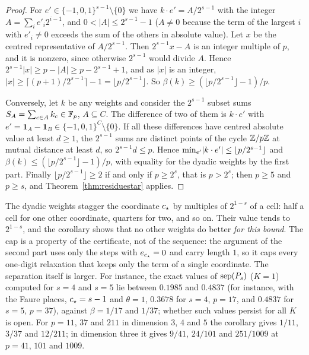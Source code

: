 \begin{proof}
For $e'\in\{-1,0,1\}^{s-1}\setminus\{0\}$ we have $k\cdot e'=A/2^{s-1}$ with the integer $A=\sum_ie'_i2^{i-1}$, and $0<|A|\le2^{s-1}-1$ ($A\ne0$ because the term of the largest $i$ with $e'_i\ne0$ exceeds the sum of the others in absolute value). Let $x$ be the centred representative of $A/2^{s-1}$. Then $2^{s-1}x-A$ is an integer multiple of $p$, and it is nonzero, since otherwise $2^{s-1}$ would divide $A$. Hence $2^{s-1}|x|\ge p-|A|\ge p-2^{s-1}+1$, and as $|x|$ is an integer, $|x|\ge\lceil(p+1)/2^{s-1}\rceil-1=\lfloor p/2^{s-1}\rfloor$. So $\beta(k)\ge(\lfloor p/2^{s-1}\rfloor-1)/p$.

Conversely, let $k$ be any weights and consider the $2^{s-1}$ subset sums $S_A=\sum_{c\in A}k_c\in\mathbb{F}_p$, $A\subseteq C$. The difference of two of them is $k\cdot e'$ with $e'=\mathbf 1_A-\mathbf 1_B\in\{-1,0,1\}^C\setminus\{0\}$. If all these differences have centred absolute value at least $d\ge1$, the $2^{s-1}$ sums are distinct points of the cycle $\mathbb{Z}/p\mathbb{Z}$ at mutual distance at least $d$, so $2^{s-1}d\le p$. Hence $\min_{e'}\lvert k\cdot e'\rvert\le\lfloor p/2^{s-1}\rfloor$ and $\beta(k)\le(\lfloor p/2^{s-1}\rfloor-1)/p$, with equality for the dyadic weights by the first part. Finally $\lfloor p/2^{s-1}\rfloor\ge2$ if and only if $p\ge2^s$, that is $p>2^s$; then $p\ge5$ and $p\ge s$, and Theorem~\ref{thm:residuestar} applies.
\end{proof}

The dyadic weights stagger the coordinate $c_{\star}$ by multiples of $2^{1-s}$ of a cell: half a cell for one other coordinate, quarters for two, and so on. Their value tends to $2^{1-s}$, and the corollary shows that no other weights do better \emph{for this bound}. The cap is a property of the certificate, not of the sequence: the argument of the second part uses only the steps with $e_{c_{\star}}=0$ and carry length $1$, so it caps every one-digit relaxation that keeps only the term of a single coordinate. The separation itself is larger. For instance, the exact values of $\operatorname{sep}(P_s)$ ($K=1$) computed for $s=4$ and $s=5$ lie between $0.1985$ and $0.4837$ (for instance, with the Faure places, $c_{\star}=s-1$ and $\theta=1$, $0.3678$ for $s=4$, $p=17$, and $0.4837$ for $s=5$, $p=37$), against $\beta=1/17$ and $1/37$; whether such values persist for all $K$ is open. For $p=11$, $37$ and $211$ in dimension $3$, $4$ and $5$ the corollary gives $1/11$, $3/37$ and $12/211$; in dimension three it gives $9/41$, $24/101$ and $251/1009$ at $p=41$, $101$ and $1009$.

